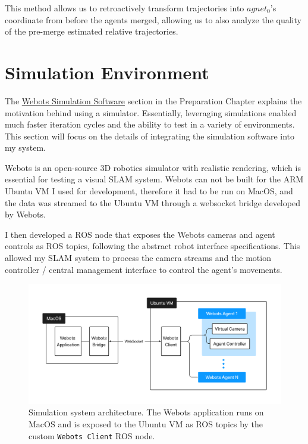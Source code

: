 This method allows us to retroactively transform trajectories into $agnet_0$'s coordinate from before the agents merged, allowing us to also analyze the quality of the pre-merge estimated relative trajectories.

\section{Simulation Environment}
\label{sec:simulation-environment}
The \hyperref[sec:webots-simulator]{Webots Simulation Software} section in the Preparation Chapter explains the motivation behind using a simulator. Essentially, leveraging simulations enabled much faster iteration cycles and the ability to test in a variety of environments. This section will focus on the details of integrating the simulation software into my system.

Webots is an open-source 3D robotics simulator with realistic rendering, which is essential for testing a visual SLAM system. Webots can not be built for the ARM Ubuntu VM I used for development, therefore it had to be run on MacOS, and the data was streamed to the Ubuntu VM through a websocket bridge developed by Webots.

I then developed a ROS node that exposes the Webots cameras and agent controls as ROS topics, following the abstract robot interface specifications. This allowed my SLAM system to process the camera streams and the motion controller / central management interface to control the agent's movements.


\begin{figure}[h]
    \centering
    \includegraphics[trim=5cm 5cm 5cm 5cm, scale=0.2]{figures/simulation_environment.pdf}

    \caption{Simulation system architecture. The Webots application runs on MacOS and is exposed to the Ubuntu VM as ROS topics by the custom \texttt{Webots Client} ROS node.}
    \label{fig:simulation-environment}
\end{figure}

